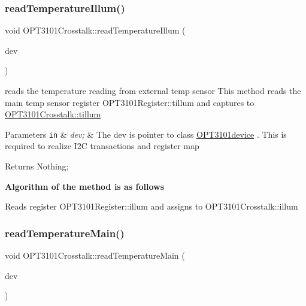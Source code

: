 \subsubsection{\texorpdfstring{read\+Temperature\+Illum()}{readTemperatureIllum()}}
{\footnotesize\ttfamily void O\+P\+T3101\+Crosstalk\+::read\+Temperature\+Illum (\begin{DoxyParamCaption}\item[{\mbox{\hyperlink{class_o_p_t3101device}{O\+P\+T3101device}} $\ast$}]{dev }\end{DoxyParamCaption})}



reads the temperature reading from external temp sensor This method reads the main temp sensor register O\+P\+T3101\+Register\+::tillum and captures to \mbox{\hyperlink{class_o_p_t3101_crosstalk_a88191108ac32b8cc9a25309ff5beae08}{O\+P\+T3101\+Crosstalk\+::tillum}} 


\begin{DoxyParams}[1]{Parameters}
\mbox{\tt in}  & {\em dev;} & The dev is pointer to class \mbox{\hyperlink{class_o_p_t3101device}{O\+P\+T3101device}} . This is required to realize I2C transactions and register map \\
\hline
\end{DoxyParams}
\begin{DoxyReturn}{Returns}
Nothing; 
\end{DoxyReturn}
{\bfseries Algorithm of the method is as follows}


\begin{DoxyItemize}
\item Reads register O\+P\+T3101\+Register\+::illum and assigns to O\+P\+T3101\+Crosstalk\+::illum 
\end{DoxyItemize}\mbox{\label{class_o_p_t3101_crosstalk_a2cae9662362161eb9a3d0e324b7513c3}} 
\subsubsection{\texorpdfstring{read\+Temperature\+Main()}{readTemperatureMain()}}
{\footnotesize\ttfamily void O\+P\+T3101\+Crosstalk\+::read\+Temperature\+Main (\begin{DoxyParamCaption}\item[{\mbox{\hyperlink{class_o_p_t3101device}{O\+P\+T3101device}} $\ast$}]{dev }\end{DoxyParamCaption})}



